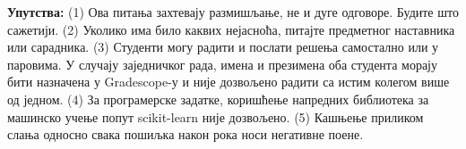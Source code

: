 {\bf Упутства:} (1) Ова питања захтевају размишљање, не и дуге одговоре. Будите што сажетији. (2) Уколико има било каквих нејасноћа, питајте предметног наставника или сарадника. (3) Студенти могу радити и послати решења самостално или у паровима. У случају заједничког рада, имена и презимена оба студента морају бити назначена у Gradescope-у и није дозвољено радити са истим колегом више од једном. (4) За програмерске задатке, коришћење напредних библиотека за машинско учење попут scikit-learn није дозвољено. (5) Кашњење приликом слања односно свака пошиљка након рока носи негативне поене.

